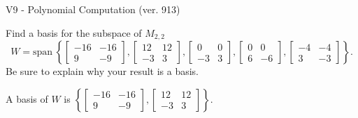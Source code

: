 \begin{exercise}
  \begin{exerciseTitle}V9 - Polynomial Computation (ver. 913)\end{exerciseTitle}
  \begin{exerciseStatement}
    Find a basis for the subspace of \(M_{2,2}\) 
\[W=\mathrm{span}\ \left\{\left[\begin{array}{cc}
-16 & -16 \\
9 & -9
\end{array}\right] , \left[\begin{array}{cc}
12 & 12 \\
-3 & 3
\end{array}\right] , \left[\begin{array}{cc}
0 & 0 \\
-3 & 3
\end{array}\right] , \left[\begin{array}{cc}
0 & 0 \\
6 & -6
\end{array}\right] , \left[\begin{array}{cc}
-4 & -4 \\
3 & -3
\end{array}\right]\right\}.\]
 Be sure to explain why your result is a basis.


  \end{exerciseStatement}
  \begin{exerciseAnswer}
   A basis of \(W\) is  \(\left\{\left[\begin{array}{cc}
-16 & -16 \\
9 & -9
\end{array}\right] , \left[\begin{array}{cc}
12 & 12 \\
-3 & 3
\end{array}\right]\right\}\).
  


  \end{exerciseAnswer}
\end{exercise}